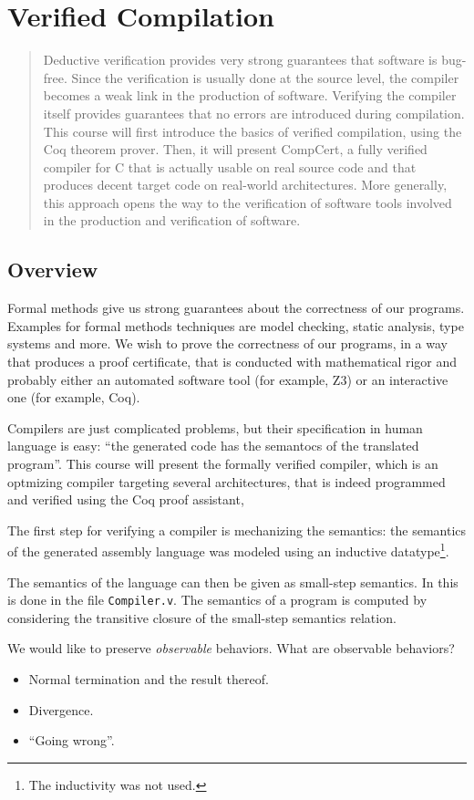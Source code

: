 \section{Verified Compilation}
\begin{abstract}
	Deductive verification provides very strong guarantees that software is bug-free. Since the verification is usually done at the source level, the compiler becomes a weak link in the production of software. Verifying the compiler itself provides guarantees that no errors are introduced during compilation.
This course will first introduce the basics of verified compilation, using the Coq theorem prover. Then, it will present CompCert, a fully verified compiler for C that is actually usable on real source code and that produces decent target code on real-world architectures. More generally, this approach opens the way to the verification of software tools involved in the production and verification of software.
\end{abstract}
\subsection{Overview}
Formal methods give us strong guarantees about the correctness of our programs.
Examples for formal methods techniques are model checking, static analysis,
type systems and more. We wish to prove the correctness of our programs, in a way
that produces a proof certificate, that is conducted with mathematical rigor and
probably either an automated software tool (for example, Z3) or an interactive one
(for example, Coq).

Compilers are just complicated problems, but their specification in human language
is easy: ``the generated code has the semantocs of the translated program''.
This course will present the \cc formally verified compiler, which is an optmizing
compiler targeting several architectures, that is indeed programmed and verified
using the Coq proof assistant,

The first step for verifying a compiler is mechanizing the semantics:
the semantics of the generated assembly language was modeled using
an inductive datatype\footnote{The inductivity was not used.}.

The semantics of the language can then be given as small-step semantics.
In \cc this is done in the file \lstinline{Compiler.v}. The semantics
of a program is computed by considering the transitive closure of
the small-step semantics relation.

We would like to preserve \emph{observable} behaviors. What are observable
behaviors?
\begin{itemize}
\item Normal termination and the result thereof.
\item Divergence.
\item ``Going wrong''.
\end{itemize}

